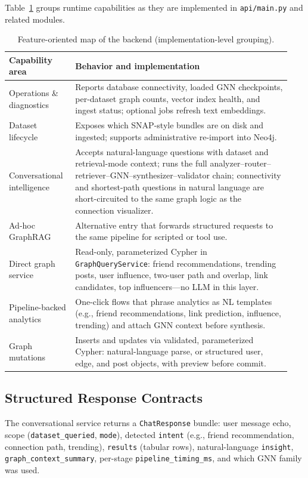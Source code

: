 \documentclass[conference]{IEEEtran}
\begin{document}
Table~\ref{tab:features} groups runtime capabilities as they are implemented in \texttt{api/main.py} and related modules.

\begin{table}[t]
\centering
\caption{Feature-oriented map of the backend (implementation-level grouping).}
\label{tab:features}
\scriptsize
\begin{tabular}{@{}p{0.22\linewidth} p{0.72\linewidth}@{}}
\toprule
\textbf{Capability area} & \textbf{Behavior and implementation} \\
\midrule
Operations \& diagnostics & Reports database connectivity, loaded GNN checkpoints, per-dataset graph counts, vector index health, and ingest status; optional jobs refresh text embeddings. \\
Dataset lifecycle & Exposes which SNAP-style bundles are on disk and ingested; supports administrative re-import into Neo4j. \\
Conversational intelligence & Accepts natural-language questions with dataset and retrieval-mode context; runs the full analyzer--router--retriever--GNN--synthesizer--validator chain; connectivity and shortest-path questions in natural language are short-circuited to the same graph logic as the connection visualizer. \\
Ad-hoc GraphRAG & Alternative entry that forwards structured requests to the same pipeline for scripted or tool use. \\
Direct graph service & Read-only, parameterized Cypher in \texttt{GraphQueryService}: friend recommendations, trending posts, user influence, two-user path and overlap, link candidates, top influencers---no LLM in this layer. \\
Pipeline-backed analytics & One-click flows that phrase analytics as NL templates (e.g., friend recommendations, link prediction, influence, trending) and attach GNN context before synthesis. \\
Graph mutations & Inserts and updates via validated, parameterized Cypher: natural-language parse, or structured user, edge, and post objects, with preview before commit. \\
\bottomrule
\end{tabular}
\end{table}

\subsection{Structured Response Contracts}
The conversational service returns a \texttt{ChatResponse} bundle: user message echo, scope (\texttt{dataset\_queried}, \texttt{mode}), detected \texttt{intent} (e.g., friend recommendation, connection path, trending), \texttt{results} (tabular rows), natural-language \texttt{insight}, \texttt{graph\_context\_summary}, per-stage \texttt{pipeline\_timing\_ms}, and which GNN family was used.
\end{document}

